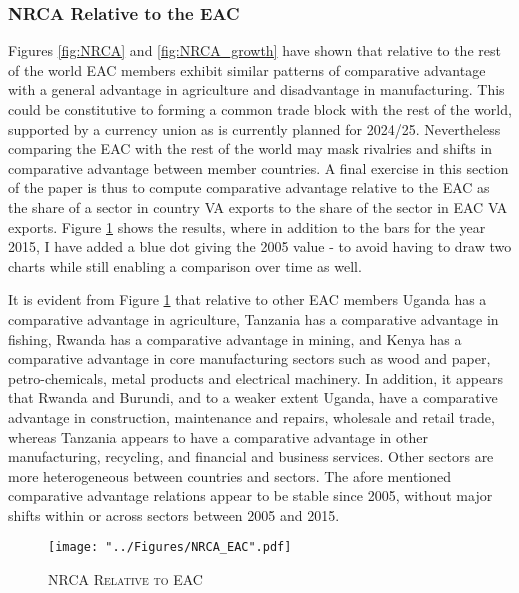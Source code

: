 \documentclass[a4paper]{article}
\begin{document}
\subsubsection{NRCA Relative to the EAC}
Figures \ref{fig:NRCA} and \ref{fig:NRCA_growth} have shown that relative to the rest of the world EAC members exhibit similar patterns of comparative advantage with a general advantage in agriculture and disadvantage in manufacturing. This could be constitutive to forming a common trade block with the rest of the world, supported by a currency union as is currently planned for 2024/25. Nevertheless comparing the EAC with the rest of the world may mask rivalries and shifts in comparative advantage between member countries. A final exercise in this section of the paper is thus to compute comparative advantage relative to the EAC as the share of a sector in country VA exports to the share of the sector in EAC VA exports. %
Figure \ref{fig:NRCA_EAC} shows the results, where in addition to the bars for the year 2015, I have added a blue dot giving the 2005 value - to avoid having to draw two charts while still enabling a comparison over time as well. \newline 

It is evident from Figure \ref{fig:NRCA_EAC} that relative to other EAC members Uganda has a comparative advantage in agriculture, Tanzania has a comparative advantage in fishing, Rwanda has a comparative advantage in mining, and Kenya has a comparative advantage in core manufacturing sectors such as wood and paper, petro-chemicals, metal products and electrical machinery. In addition, it appears that Rwanda and Burundi, and to a weaker extent Uganda, have a comparative advantage in construction, maintenance and repairs, wholesale and retail trade, whereas Tanzania appears to have a comparative advantage in other manufacturing, recycling, and financial and business services. Other sectors are more heterogeneous between countries and sectors. The afore mentioned comparative advantage relations appear to be stable since 2005, without major shifts within or across sectors between 2005 and 2015. 

\begin{figure}[h!]
\centering
\caption{\label{fig:NRCA_EAC}\textsc{NRCA Relative to EAC}}
\texttt{[image: "../Figures/NRCA\_EAC".pdf]} %
\end{figure}
\FloatBarrier
\end{document}
